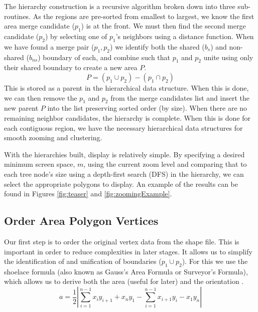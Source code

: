 The hierarchy construction is a recursive algorithm broken down into three sub-routines. As the regions are pre-sorted from smallest to largest, we know the first area merge candidate ($p_1$) is at the front. We must then find the second merge candidate ($p_2$) by selecting one of $p_1$'s neighbors using a distance function. When we have found a merge pair ($p_1, p_2$) we identify both the shared ($b_{s}$) and non-shared ($b_{ns}$) boundary of each, and combine such that $p_1$ and $p_2$ unite using only their shared boundary to create a new area $P$. 
\begin{equation} \label{eq:P}
P = (p_1 \cup  p_2) - (p_1 \cap p_2) 
\end{equation}
This is stored as a parent in the hierarchical data structure. When this is done, we can then remove the $p_1$ and $p_2$ from the merge candidates list and insert the new parent $P$ into the list preserving sorted order (by size). When there are no remaining neighbor candidates, the hierarchy is complete. When this is done for each contiguous region, we have the necessary hierarchical data structures for smooth zooming and clustering. 

With the hierarchies built, display is relatively simple. By specifying a desired minimum screen space, $m$, using the current zoom level and comparing that to each tree node's size using a depth-first search (DFS) in the hierarchy, we can select the appropriate polygons to display. An example of the results can be found in Figures \ref{fig:teaser} and \ref{fig:zoomingExample}.

\subsection{Order Area Polygon Vertices} \label{ordering}
Our first step is to order the original vertex data from the shape file. This is important in order to reduce complexities in later stages. It allows us to simplify the identification of and unification of boundaries ($p_1 \cup p_2$). For this we use the shoelace formula (also known as Gauss's Area Formula or Surveyor's Formula), which allows us to derive both the area (useful for later) and the orientation \cite{braden1986surveyor}.
\begin{equation}\label{eq:surveyor}
a = \frac{1}{2} \left | \sum_{i=1}^{n-1} x_iy_{i+1} + x_ny_1 - \sum_{i=1}^{n-1} x_{i+1}y_i - x_1y_n \right |
\end{equation} 

